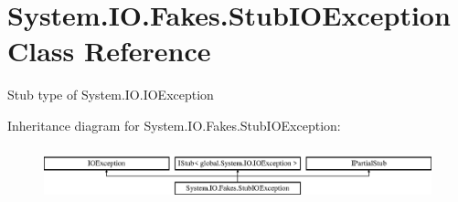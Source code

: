 \hypertarget{class_system_1_1_i_o_1_1_fakes_1_1_stub_i_o_exception}{\section{System.\-I\-O.\-Fakes.\-Stub\-I\-O\-Exception Class Reference}
\label{class_system_1_1_i_o_1_1_fakes_1_1_stub_i_o_exception}
}


Stub type of System.\-I\-O.\-I\-O\-Exception 


Inheritance diagram for System.\-I\-O.\-Fakes.\-Stub\-I\-O\-Exception\-:\begin{figure}[H]
\begin{center}
\leavevmode
\includegraphics[height=1.562064cm]{class_system_1_1_i_o_1_1_fakes_1_1_stub_i_o_exception}
\end{center}
\end{figure}
